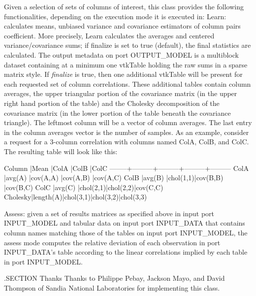 Given a selection of sets of columns of interest, this class provides the following functionalities, depending on the execution mode it is executed in\-: Learn\-: calculates means, unbiased variance and covariance estimators of column pairs coefficient. More precisely, Learn calculates the averages and centered variance/covariance sums; if {\ttfamily finalize} is set to true (default), the final statistics are calculated. The output metadata on port O\-U\-T\-P\-U\-T\-\_\-\-M\-O\-D\-E\-L is a multiblock dataset containing at a minimum one vtk\-Table holding the raw sums in a sparse matrix style. If {\itshape finalize} is true, then one additional vtk\-Table will be present for each requested set of column correlations. These additional tables contain column averages, the upper triangular portion of the covariance matrix (in the upper right hand portion of the table) and the Cholesky decomposition of the covariance matrix (in the lower portion of the table beneath the covariance triangle). The leftmost column will be a vector of column averages. The last entry in the column averages vector is the number of samples. As an example, consider a request for a 3-\/column correlation with columns named Col\-A, Col\-B, and Col\-C. The resulting table will look like this\-: 
\begin{DoxyPre}
      Column  |Mean     |ColA     |ColB     |ColC
      --------+---------+---------+---------+---------
      ColA    |avg(A)   |cov(A,A) |cov(A,B) |cov(A,C)
      ColB    |avg(B)   |chol(1,1)|cov(B,B) |cov(B,C)
      ColC    |avg(C)   |chol(2,1)|chol(2,2)|cov(C,C)
      Cholesky|length(A)|chol(3,1)|chol(3,2)|chol(3,3)
   \end{DoxyPre}
 Assess\-: given a set of results matrices as specified above in input port I\-N\-P\-U\-T\-\_\-\-M\-O\-D\-E\-L and tabular data on input port I\-N\-P\-U\-T\-\_\-\-D\-A\-T\-A that contains column names matching those of the tables on input port I\-N\-P\-U\-T\-\_\-\-M\-O\-D\-E\-L, the assess mode computes the relative deviation of each observation in port I\-N\-P\-U\-T\-\_\-\-D\-A\-T\-A's table according to the linear correlations implied by each table in port I\-N\-P\-U\-T\-\_\-\-M\-O\-D\-E\-L.

.S\-E\-C\-T\-I\-O\-N Thanks Thanks to Philippe Pebay, Jackson Mayo, and David Thompson of Sandia National Laboratories for implementing this class.

